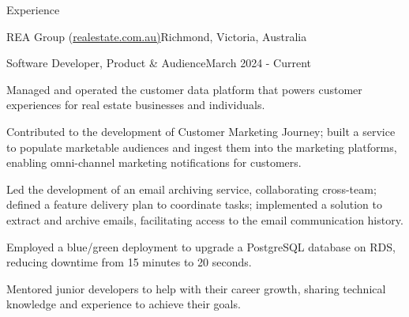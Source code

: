 \documentclass{xsha}
\begin{document}
\begin{xsection}{Experience}

\begin{xheading}{REA Group (\href{https://realestate.com.au/}{realestate.com.au)}}{Richmond, Victoria, Australia}
\begin{xsubheading}{Software Developer, Product \& Audience}{March 2024 - Current}
\item Managed and operated the customer data platform that powers customer experiences for real estate businesses and individuals.
\item Contributed to the development of Customer Marketing Journey; built a service to populate marketable audiences and ingest them into the marketing platforms, enabling omni-channel marketing notifications for customers.
\item Led the development of an email archiving service, collaborating cross-team; defined a feature delivery plan to coordinate tasks; implemented a solution to extract and archive emails, facilitating access to the email communication history.
\item Employed a blue/green deployment to upgrade a PostgreSQL database on RDS, reducing downtime from 15 minutes to 20 seconds.
\item Mentored junior developers to help with their career growth, sharing technical knowledge and experience to achieve their goals.
\end{xsubheading}
\end{xheading}


\end{xsection}
\end{document}
